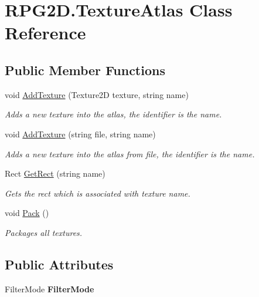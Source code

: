 \hypertarget{class_r_p_g2_d_1_1_texture_atlas}{}\section{R\+P\+G2\+D.\+Texture\+Atlas Class Reference}
\label{class_r_p_g2_d_1_1_texture_atlas}
\subsection*{Public Member Functions}
\begin{DoxyCompactItemize}
\item 
void \mbox{\hyperlink{class_r_p_g2_d_1_1_texture_atlas_a6ae525140aaa805c849a86ef345cedfe}{Add\+Texture}} (Texture2D texture, string name)
\begin{DoxyCompactList}\small\item\em Adds a new texture into the atlas, the identifier is the name. \end{DoxyCompactList}\item 
void \mbox{\hyperlink{class_r_p_g2_d_1_1_texture_atlas_a4cec194e23e586d0604379d5bb38fe72}{Add\+Texture}} (string file, string name)
\begin{DoxyCompactList}\small\item\em Adds a new texture into the atlas from file, the identifier is the name. \end{DoxyCompactList}\item 
Rect \mbox{\hyperlink{class_r_p_g2_d_1_1_texture_atlas_a3885f49ace63b00ebcbcfe6a63ca114c}{Get\+Rect}} (string name)
\begin{DoxyCompactList}\small\item\em Gets the rect which is associated with texture name. \end{DoxyCompactList}\item 
void \mbox{\hyperlink{class_r_p_g2_d_1_1_texture_atlas_a1ca0eef601c357e75ffd2e7b7e9348d3}{Pack}} ()
\begin{DoxyCompactList}\small\item\em Packages all textures. \end{DoxyCompactList}\end{DoxyCompactItemize}
\subsection*{Public Attributes}
\begin{DoxyCompactItemize}
\item 
\mbox{\label{class_r_p_g2_d_1_1_texture_atlas_a2146b08e7302ca1bfbb4806992ecfc91}} 
Filter\+Mode {\bfseries Filter\+Mode}
\end{DoxyCompactItemize}
